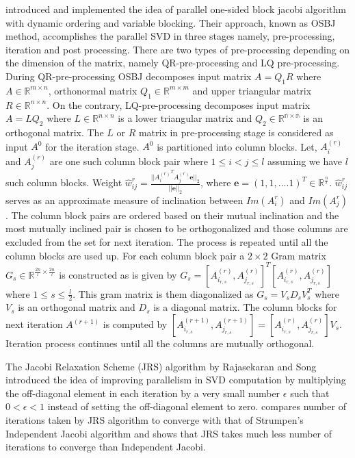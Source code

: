 \documentclass[10pt, conference, compsocconf]{IEEEtran}
\begin{document}
\cite{bevcka2013parallel, kudo2016parallel, becka2015parallel} introduced and implemented the idea of parallel one-sided block jacobi algorithm with dynamic ordering and variable blocking. Their approach, known as OSBJ method, accomplishes the parallel SVD in three stages namely, pre-processing, iteration and post processing. There are two types of pre-processing depending on the dimension of the matrix, namely QR-pre-processing and LQ pre-processing. During QR-pre-processing OSBJ decomposes input matrix $A = Q_1R$ where $A \in \mathbb{R}^{m \times n}$, orthonormal matrix $Q_1 \in \mathbb{R}^{m \times m}$ and upper triangular matrix $R \in \mathbb{R}^{n \times n}$. On the contrary, LQ-pre-processing decomposes input matrix $A = LQ_2$ where $L \in \mathbb{R}^{n \times n}$ is a lower triangular matrix and $Q_2 \in \mathbb{R^{n \times n}}$ is an orthogonal matrix. The $L$ or $R$ matrix in pre-processing stage is considered as input $A^0$ for the iteration stage.
$A^0$ is partitioned into column blocks. Let, $A^{(r)}_i$ and $A^{(r)}_j$ are one such column block pair where $1 \leq i < j \leq l$ assuming we have $l$ such column blocks. Weight $\hat{w}^{r}_{ij} = \frac{||{A^{(r)}_i}^TA^{(r)}_j\textbf{e}||_2}{||\textbf{e}||_2}$, where $\textbf{e} = (1, 1, ....1)^T \in \mathbb{R}^{\frac{n}{l}}$.  $\hat{w}^{r}_{ij}$ serves as an approximate measure of inclination between $Im(A^{r}_i)$ and $Im(A^{r}_j)$. The column block pairs are ordered based on their mutual inclination and the most mutually inclined pair is chosen to be orthogonalized and those columns are excluded from the set for next iteration. The process is repeated until all the column blocks are used up. For each column block pair a $2 \times 2$ Gram matrix $G_s \in \mathbb{R}^{\frac{2n}{l} \times \frac{2n}{l}}$ is constructed as is given by $G_s = [A^{(r)}_{i_{r,s}},A^{(r)}_{j_{r,s}}]^T[A^{(r)}_{i_{r,s}},A^{(r)}_{j_{r,s}}]$ where $1 \leq s \leq \frac{l}{2}$. This gram matrix is them diagonalized as $G_s = V_sD_sV_s^T$ where $V_s$ is an orthogonal matrix and $D_s$ is a diagonal matrix. The column blocks for next iteration $A^{(r+1)}$ is computed by $[A^{(r+1)}_{i_{r,s}},A^{(r+1)}_{j_{r,s}}] = [A^{(r)}_{i_{r,s}},A^{(r)}_{j_{r,s}}]V_s$. Iteration process continues until all the columns are mutually orthogonal. 
\par The Jacobi Relaxation Scheme (JRS) algorithm by Rajasekaran and Song introduced the idea of improving parallelism in SVD computation by 
multiplying the off-diagonal element in each iteration by a very small number $\epsilon$ such that $0 < \epsilon < 1$ instead of setting the off-diagonal element to zero. \cite{rajasekaran2008relaxation} compares number of iterations taken by JRS algorithm to converge with that of Strumpen's Independent Jacobi algorithm \cite{strumpen2003stream} and shows that JRS takes much less number of iterations to converge than Independent Jacobi. 
\end{document}
